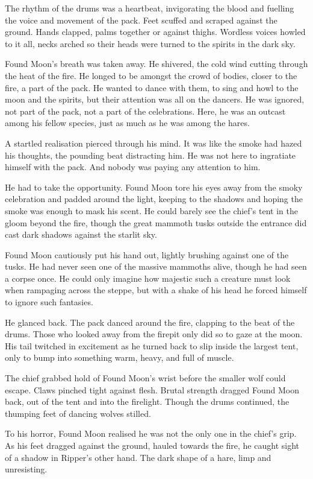 The rhythm of the drums was a heartbeat, invigorating the blood and fuelling the voice and movement of the pack. Feet scuffed and scraped against the ground. Hands clapped, palms together or against thighs. Wordless voices howled to it all, necks arched so their heads were turned to the spirits in the dark sky.

Found Moon's breath was taken away. He shivered, the cold wind cutting through the heat of the fire. He longed to be amongst the crowd of bodies, closer to the fire, a part of the pack. He wanted to dance with them, to sing and howl to the moon and the spirits, but their attention was all on the dancers. He was ignored, not part of the pack, not a part of the celebrations. Here, he was an outcast among his fellow species, just as much as he was among the hares.

A startled realisation pierced through his mind. It was like the smoke had hazed his thoughts, the pounding beat distracting him. He was not here to ingratiate himself with the pack. And nobody was paying any attention to him.

He had to take the opportunity. Found Moon tore his eyes away from the smoky celebration and padded around the light, keeping to the shadows and hoping the smoke was enough to mask his scent. He could barely see the chief's tent in the gloom beyond the fire, though the great mammoth tusks outside the entrance did cast dark shadows against the starlit sky.

Found Moon cautiously put his hand out, lightly brushing against one of the tusks. He had never seen one of the massive mammoths alive, though he had seen a corpse once. He could only imagine how majestic such a creature must look when rampaging across the steppe, but with a shake of his head he forced himself to ignore such fantasies.

He glanced back. The pack danced around the fire, clapping to the beat of the drums. Those who looked away from the firepit only did so to gaze at the moon. His tail twitched in excitement as he turned back to slip inside the largest tent, only to bump into something warm, heavy, and full of muscle.

The chief grabbed hold of Found Moon's wrist before the smaller wolf could escape. Claws pinched tight against flesh. Brutal strength dragged Found Moon back, out of the tent and into the firelight. Though the drums continued, the thumping feet of dancing wolves stilled.

To his horror, Found Moon realised he was not the only one in the chief's grip. As his feet dragged against the ground, hauled towards the fire, he caught sight of a shadow in Ripper's other hand. The dark shape of a hare, limp and unresisting.

